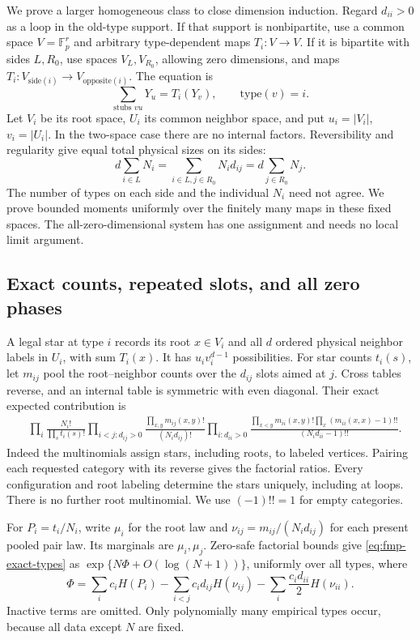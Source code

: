 We prove a larger homogeneous class to close dimension induction.
Regard $d_{ii}>0$ as a loop in the old-type support. If that support
is nonbipartite, use a common space $V=\mathbb F_p^r$ and arbitrary
type-dependent maps $T_i:V\to V$. If it is bipartite with sides
$L,R_0$, use spaces $V_L,V_{R_0}$, allowing zero dimensions, and maps
$T_i:V_{\mathrm{side}(i)}\to V_{\mathrm{opposite}(i)}$. The equation is
\begin{equation}\label{eq:fmp-system}
 \sum_{\text{stubs }vu}Y_u=T_i(Y_v),\qquad \mathrm{type}(v)=i.
\end{equation}
Let $V_i$ be its root space, $U_i$ its common neighbor space, and put
$u_i=|V_i|$, $v_i=|U_i|$. In the two-space case there are no internal
factors. Reversibility and regularity give equal total physical sizes
on its sides:
\[
 d\sum_{i\in L}N_i=\sum_{i\in L,j\in R_0}N_id_{ij}
                         =d\sum_{j\in R_0}N_j.
\]
The number of types on each side and the individual $N_i$ need not
agree. We prove bounded moments uniformly over the finitely many
maps in these fixed spaces. The all-zero-dimensional system has one
assignment and needs no local limit argument.

\subsection{Exact counts, repeated slots, and all zero phases}
A legal star at type $i$ records its root $x\in V_i$ and all $d$
ordered physical neighbor labels in $U_i$, with sum $T_i(x)$. It has
$u_iv_i^{d-1}$ possibilities. For star counts $t_i(s)$, let $m_{ij}$
pool the root--neighbor counts over the $d_{ij}$ slots aimed at $j$.
Cross tables reverse, and an internal table is symmetric with even
diagonal. Their exact expected contribution is
\begin{align}\label{eq:fmp-exact-types}
 &\prod_i\frac{N_i!}{\prod_s t_i(s)!}
 \prod_{i<j:d_{ij}>0}\frac{\prod_{x,y}m_{ij}(x,y)!}{(N_id_{ij})!}
 \prod_{i:d_{ii}>0}
 \frac{\prod_{x<y}m_{ii}(x,y)!\prod_x(m_{ii}(x,x)-1)!!}
 {(N_id_{ii}-1)!!}.
\end{align}
Indeed the multinomials assign stars, including roots, to labeled
vertices. Pairing each requested category with its reverse gives the
factorial ratios. Every configuration and root labeling determine
the stars uniquely, including at loops. There is no further root
multinomial. We use $(-1)!!=1$ for empty categories.

For $P_i=t_i/N_i$, write $\mu_i$ for the root law and
$\nu_{ij}=m_{ij}/(N_id_{ij})$ for each present pooled pair law. Its
marginals are $\mu_i,\mu_j$. Zero-safe factorial bounds give
\eqref{eq:fmp-exact-types} as $\exp\{N\Phi+O(\log(N+1))\}$,
uniformly over all types, where
\[
 \Phi=\sum_i c_iH(P_i)-\sum_{i<j}c_id_{ij}H(\nu_{ij})
                         -\sum_i\frac{c_id_{ii}}2H(\nu_{ii}).
\]
Inactive terms are omitted. Only polynomially many empirical types
occur, because all data except $N$ are fixed.

